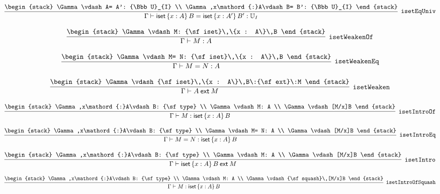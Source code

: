 \[
\infer[{\tt isetEqUniv}]{\Gamma \vdash {\sf iset}\,\{x : A\}\,B= {\sf iset}\,\{x : A'\}\,B': {\Bbb U}_{I}}{
\begin{stack}
\Gamma \vdash A= A': {\Bbb U}_{I}
\\
\Gamma ,x\mathord{:}A\vdash B= B': {\Bbb U}_{I}
\end{stack}}
\]

\[
\infer[{\tt isetWeakenOf}]{\Gamma \vdash M: A}{
\begin{stack}
\Gamma \vdash M: {\sf iset}\,\{x : A\}\,B
\end{stack}}
\]

\[
\infer[{\tt isetWeakenEq}]{\Gamma \vdash M= N: A}{
\begin{stack}
\Gamma \vdash M= N: {\sf iset}\,\{x : A\}\,B
\end{stack}}
\]

\[
\infer[{\tt isetWeaken}]{\Gamma \vdash A\:{\sf ext}\:M}{
\begin{stack}
\Gamma \vdash {\sf iset}\,\{x : A\}\,B\:{\sf ext}\:M
\end{stack}}
\]

\[
\infer[{\tt isetIntroOf}]{\Gamma \vdash M: {\sf iset}\,\{x : A\}\,B}{
\begin{stack}
\Gamma ,x\mathord{:}A\vdash B: {\sf type}
\\
\Gamma \vdash M: A
\\
\Gamma \vdash [M/x]B
\end{stack}}
\]

\[
\infer[{\tt isetIntroEq}]{\Gamma \vdash M= N: {\sf iset}\,\{x : A\}\,B}{
\begin{stack}
\Gamma ,x\mathord{:}A\vdash B: {\sf type}
\\
\Gamma \vdash M= N: A
\\
\Gamma \vdash [M/x]B
\end{stack}}
\]

\[
\infer[{\tt isetIntro}]{\Gamma \vdash {\sf iset}\,\{x : A\}\,B\:{\sf ext}\:M}{
\begin{stack}
\Gamma ,x\mathord{:}A\vdash B: {\sf type}
\\
\Gamma \vdash M: A
\\
\Gamma \vdash [M/x]B
\end{stack}}
\]

\[
\infer[{\tt isetIntroOfSquash}]{\Gamma \vdash M: {\sf iset}\,\{x : A\}\,B}{
\begin{stack}
\Gamma ,x\mathord{:}A\vdash B: {\sf type}
\\
\Gamma \vdash M: A
\\
\Gamma \vdash {\sf squash}\,[M/x]B
\end{stack}}
\]

